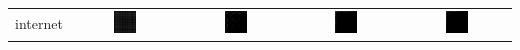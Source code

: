 \documentclass{article}
\begin{document}
\begin{table}[h]
\begin{tabular}{l | c c c c}
\hline
internet
&
    \includegraphics[width=0.23\textwidth]{../img/internet/adjacency-matrix-random-ordering.png}
& 
    \includegraphics[width=0.23\textwidth]{../img/internet/adjacency-matrix-given-ordering.png}
& 
    \includegraphics[width=0.23\textwidth]{../img/internet/adjacency-matrix-degree-ordering.png}
& 
    \includegraphics[width=0.23\textwidth]{../img/internet/adjacency-matrix-slashburn-ordering.png} \\


\end{tabular}
\end{table}
\end{document}
